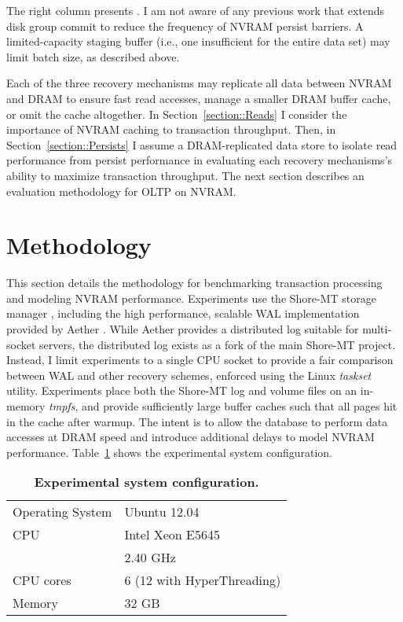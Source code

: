 The right column presents \GroupCommit.
I am not aware of any previous work that extends disk group commit to reduce the frequency of NVRAM persist barriers.
A limited-capacity staging buffer (i.e., one insufficient for the entire data set) may limit batch size, as described above.

Each of the three recovery mechanisms may replicate all data between NVRAM and DRAM to ensure fast read accesses, manage a smaller DRAM buffer cache, or omit the cache altogether.
In Section~\ref{section::Reads} I consider the importance of NVRAM caching to transaction throughput.
Then, in Section~\ref{section::Persists} I assume a DRAM-replicated data store to isolate read performance from persist performance in evaluating each recovery mechanisms's ability to maximize transaction throughput.
The next section describes an evaluation methodology for OLTP on NVRAM.

\section{Methodology}
\label{sec:OLTP_design:Methodology}

This section details the methodology for benchmarking transaction processing and modeling NVRAM performance.
Experiments use the Shore-MT storage manager \cite{JohnsonPandis09}, including the high performance, scalable WAL implementation provided by Aether \cite{JohnsonPandis10}.
While Aether provides a distributed log suitable for multi-socket servers, the distributed log exists as a fork of the main Shore-MT project.
Instead, I limit experiments to a single CPU socket to provide a fair comparison between WAL and other recovery schemes, enforced using the Linux \emph{taskset} utility.
Experiments place both the Shore-MT log and volume files on an in-memory \emph{tmpfs}, and provide sufficiently large buffer caches such that all pages hit in the cache after warmup.
The intent is to allow the database to perform data accesses at DRAM speed and introduce additional delays to model NVRAM performance.
Table~\ref{table::Specs} shows the experimental system configuration.

\begin{table}
  \centering
  \begin{tabular}{l l}
    \hline
    Operating System & Ubuntu 12.04 \\
    CPU & Intel Xeon E5645 \\
    & 2.40 GHz \\
    CPU cores & 6 (12 with HyperThreading) \\
    Memory & 32 GB \\
    \hline
  \end{tabular}
  \caption{\textbf{Experimental system configuration.}}
  \label{table::Specs}
\end{table}

